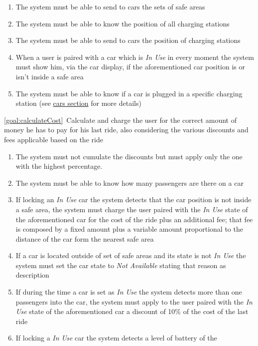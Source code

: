 \begin{description}
\begin{enumerate}[resume*]
  				\item The system must be able to send to cars the sets of safe areas
  				\item The system must be able to know the position of all charging stations
  				\item The system must be able to send to cars the position of charging stations
  				\item When a user is paired with a car which is \emph{In Use} in every moment the
  				system must show him, via the car display, if the aforementioned car position is or
  				isn't inside a safe area
  				\item The system must be able to know if a car is plugged in a specific charging
  				station (see \hyperref[sec:cars]{cars section} for more details)
   			\end{enumerate}
  		\item \ref{goal:calculateCost}\ Calculate and charge the user for the correct amount of money he has to pay for his last ride, also considering the various discounts and fees applicable based on the ride
  			\begin{enumerate}[resume*]
  			    \item The system must not cumulate the discounts but must apply only the one with
  			    the highest percentage.
  			    \item The system must be able to know how many passengers are there on a car	
  				\item If locking an \emph{In Use} car the system detects that the car position is not
  				inside a safe area, the system must charge the user paired with the \emph{In Use}
  				state of the aforementioned car for the cost of the ride plus an additional fee; that fee
  				is composed by a fixed amount plus a variable amount proportional to the distance of
  				the car form the nearest safe area
  				\item If a car is located outside of set of safe areas and its state is not \emph{In
  				Use} the system must set the car state to \emph{Not Available} stating that reason
  				as description
  				\item If during the time a car is set as \emph{In Use} the system detects more than
  				one passengers into the car, the system must apply to the user paired with
  				the \emph{In Use} state of the aforementioned car a discount of 10\% of the cost
  				of the last ride
  				\item If locking  a \emph{In Use} car the system detects a level of battery of the

\end{enumerate}
\end{description}
